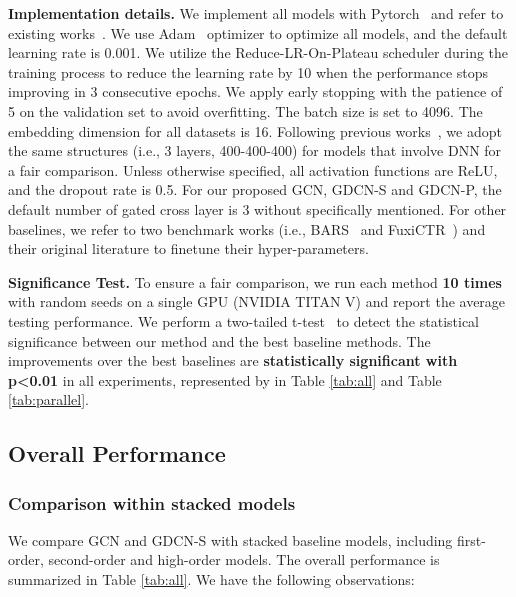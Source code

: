 \documentclass[sigconf]{acmart}
\begin{document}
\textbf{Implementation details.}
We implement all models with Pytorch~\cite{paszke2019pytorch} and refer to existing works~\cite{zhu2022bars, zhu2020fuxictr, chen2021dcap}. We use Adam~\cite{kingma2014adam} optimizer to optimize all models, and the default learning rate is 0.001. We utilize the Reduce-LR-On-Plateau scheduler during the training process to reduce the learning rate by 10 when the performance stops improving in 3 consecutive epochs. We apply early stopping with the patience of 5 on the validation set to avoid overfitting. The batch size is set to 4096. The embedding dimension for all datasets is 16. Following previous works~\cite{guo2017deepfm, cheng2020adaptive, meng2021autopi, song2019autoint, huang2019fibinet, chen2021enhancing}, we adopt the same structures (i.e., 3 layers, 400-400-400) for models that involve DNN for a fair comparison. Unless otherwise specified, all activation functions are ReLU, and the dropout rate is 0.5. For our proposed GCN, GDCN-S and GDCN-P, the default number of gated cross layer is 3 without specifically mentioned. For other baselines, we refer to two benchmark works (i.e., BARS~\cite{zhu2022bars} and FuxiCTR~\cite{zhu2020fuxictr}) and their original literature to finetune their hyper-parameters.


\textbf{Significance Test.} To ensure a fair comparison, we run each method \textbf{10 times} with random seeds on a single GPU (NVIDIA TITAN V) and report the average testing performance. We perform a two-tailed t-test~\cite{liu2019fgcnn,wang2022mcrf,wang2022enhancing} to detect the statistical significance between our method and the best baseline methods. The improvements over the best baselines are \textbf{statistically significant with p<0.01} in all experiments, represented by  in Table \ref{tab:all} and Table \ref{tab:parallel}. 





\subsection{Overall Performance}
\subsubsection{Comparison within stacked models} 
We compare GCN and GDCN-S with stacked baseline models, including first-order, second-order and high-order models. The overall performance is summarized in Table \ref{tab:all}. We have the following observations:
\end{document}
